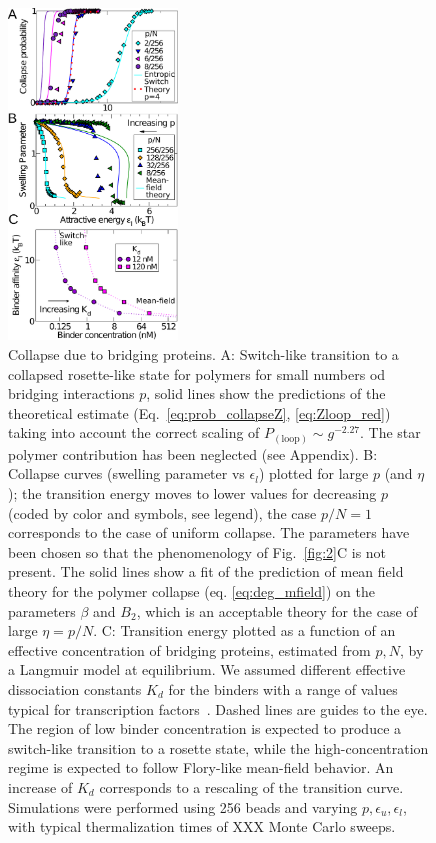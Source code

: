 \documentclass[
preprint,
a4paper,
12pt,
superscriptaddress,
pre]{revtex4}
\begin{document}
\begin{figure}
  \centering
  \includegraphics[width=0.4\textwidth]{fig3}
  \caption{Collapse due to bridging proteins.  A: Switch-like
    transition to a collapsed rosette-like state for polymers for
    small numbers od 
    bridging interactions $p$, solid lines show the predictions of
    the theoretical estimate (Eq.~\ref{eq:prob_collapseZ},
    \ref{eq:Zloop_red})
    taking into
    account the correct scaling of
    $P_\mathrm{(loop)} \sim g^{-2.27}$. The star polymer
    contribution has been neglected (see Appendix).
%
B: Collapse curves (swelling parameter vs
    $\epsilon_l$) plotted for large $p$ (and $\eta$); the transition
    energy moves to 
    lower values for decreasing $p$ (coded by color and
    symbols, see legend), the case $p/N=1$ corresponds to the case of
    uniform collapse. The parameters have been chosen so that the
    phenomenology of Fig.~\ref{fig:2}C is not present. The solid lines
    show a fit of the prediction of mean field theory for the polymer
    collapse (eq. \ref{eq:deg_mfield}) on the parameters $\beta$ and
    $B_2$, which is an acceptable theory for the case of large $\eta= p/N$.
C:  Transition energy plotted as a function of an effective
concentration  of bridging proteins, estimated  from $p,N$, by a 
Langmuir model at equilibrium. We assumed different effective
dissociation constants $K_d$  
for the binders with a range of values typical for transcription
factors~\cite{Buchler29042003}. Dashed lines are guides to the
eye. The region of low binder concentration is expected to produce a
switch-like transition to a rosette state, while the
high-concentration regime is expected to follow Flory-like mean-field
behavior. An 
increase of $K_d$ corresponds to a rescaling of the transition curve. 
%
Simulations were performed using 256 beads and varying
$p,\epsilon_u,\epsilon_l$, with typical thermalization times of XXX
Monte Carlo sweeps.  }
  \label{fig:3}
\end{figure}
\end{document}
